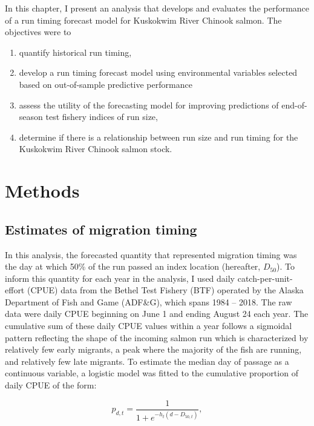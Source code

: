 \documentclass[12pt,]{book}
\providecommand{\tightlist}{%
  \setlength{\itemsep}{0pt}\setlength{\parskip}{0pt}}
\theoremstyle{definition}
\theoremstyle{definition}
\theoremstyle{definition}
\theoremstyle{remark}
\begin{document}
In this chapter, I present an analysis that develops and evaluates the
performance of a run timing forecast model for Kuskokwim River Chinook
salmon. The objectives were to

\begin{enumerate}
\def\labelenumi{(\arabic{enumi})}
\tightlist
\item
  quantify historical run timing,
\item
  develop a run timing forecast model using environmental variables
  selected based on out-of-sample predictive performance
\item
  assess the utility of the forecasting model for improving predictions
  of end-of-season test fishery indices of run size,
\item
  determine if there is a relationship between run size and run timing
  for the Kuskokwim River Chinook salmon stock.
\end{enumerate}

\section{Methods}\label{methods}

\subsection{Estimates of migration
timing}\label{estimates-of-migration-timing}

\noindent
In this analysis, the forecasted quantity that represented migration
timing was the day at which 50\% of the run passed an index location
(hereafter, \(D_{50}\)). To inform this quantity for each year in the
analysis, I used daily catch-per-unit-effort (CPUE) data from the Bethel
Test Fishery (BTF) operated by the Alaska Department of Fish and Game
(ADF\&G), which spans 1984 -- 2018. The raw data were daily CPUE
beginning on June 1 and ending August 24 each year. The cumulative sum
of these daily CPUE values within a year follows a sigmoidal pattern
reflecting the shape of the incoming salmon run which is characterized
by relatively few early migrants, a peak where the majority of the fish
are running, and relatively few late migrants. To estimate the median
day of passage as a continuous variable, a logistic model was fitted to
the cumulative proportion of daily CPUE of the form:

\begin{equation}
  p_{d,t}=\frac{1}{1 + e^{-h_t (d - D_{50,t})}},
  \label{eq:logistic}
\end{equation}
\end{document}
